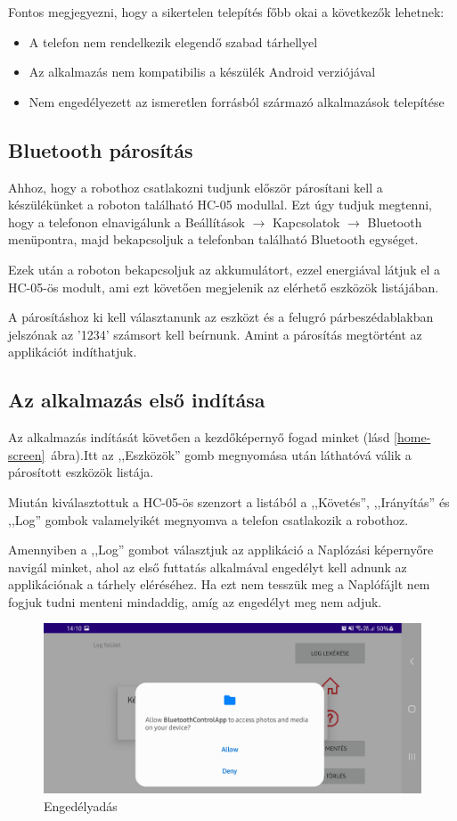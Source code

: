 \documentclass[]{thesis-ekf}
\theoremstyle{definition}
\begin{document}
Fontos megjegyezni, hogy a sikertelen telepítés főbb okai a következők lehetnek:
\begin{itemize}
	\item A telefon nem rendelkezik elegendő szabad tárhellyel
	\item Az alkalmazás nem kompatibilis a készülék Android verziójával
	\item Nem engedélyezett az ismeretlen forrásból származó alkalmazások telepítése
\end{itemize}
\subsection{Bluetooth párosítás}
Ahhoz, hogy a robothoz csatlakozni tudjunk először párosítani kell a készülékünket a roboton található HC-05 modullal. Ezt úgy tudjuk megtenni, hogy a telefonon elnavigálunk a Beállítások $\rightarrow$ Kapcsolatok $\rightarrow$ Bluetooth menüpontra, majd bekapcsoljuk a telefonban található Bluetooth egységet.

Ezek után a roboton bekapcsoljuk az akkumulátort, ezzel energiával látjuk el a HC-05-ös modult, ami ezt követően megjelenik az elérhető eszközök listájában.

A párosításhoz ki kell választanunk az eszközt és a felugró párbeszédablakban jelszónak az '1234' számsort kell beírnunk. Amint a párosítás megtörtént az applikációt indíthatjuk.
\subsection{Az alkalmazás első indítása}
Az alkalmazás indítását követően a kezdőképernyő fogad minket (lásd \ref{home-screen}~ábra).Itt az ,,Eszközök'' gomb megnyomása után láthatóvá válik a párosított eszközök listája.

Miután kiválasztottuk a HC-05-ös szenzort a listából a ,,Követés'', ,,Irányítás'' és ,,Log'' gombok valamelyikét megnyomva a telefon csatlakozik a robothoz.

Amennyiben a ,,Log'' gombot választjuk az applikáció a Naplózási képernyőre navigál minket, ahol az első futtatás alkalmával engedélyt kell adnunk az applikációnak a tárhely eléréséhez. Ha ezt nem tesszük meg a Naplófájlt nem fogjuk tudni menteni mindaddig, amíg az engedélyt meg nem adjuk.
\begin{figure}[h]
	\centering
	\includegraphics[width=\columnwidth]{images/app_screen/permission_grant}
	\caption{Engedélyadás}
	\label{grant_permission}
\end{figure}
\end{document}
